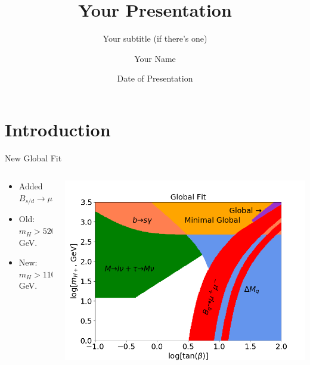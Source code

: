\documentclass[10pt,xcolor={table,dvipsnames},t]{beamer}
\title[Your Short Title]{Your Presentation}
\subtitle{Your subtitle (if there's one)}
\author{Your Name}
\institute{Your Faculty/Department}
\date{Date of Presentation}
\begin{document}
\section{Introduction}



\begin{frame}{New Global Fit}
    \begin{columns}[c]
        \begin{column}{0.33\textwidth}
            \begin{itemize}
                \setlength\itemsep{2em}
                \item Added $B_{s/d}\to\mu^+\mu^-$
                \item Old: $m_H>520\,$GeV.
                \item New: $m_H>1100\,$GeV.
            \end{itemize}
        \end{column}
        \begin{column}{0.60\textwidth}
            \includegraphics[scale=0.35]{../images/global_cl.png}
        \end{column}
    \end{columns}
%

\end{frame}
\end{document}
